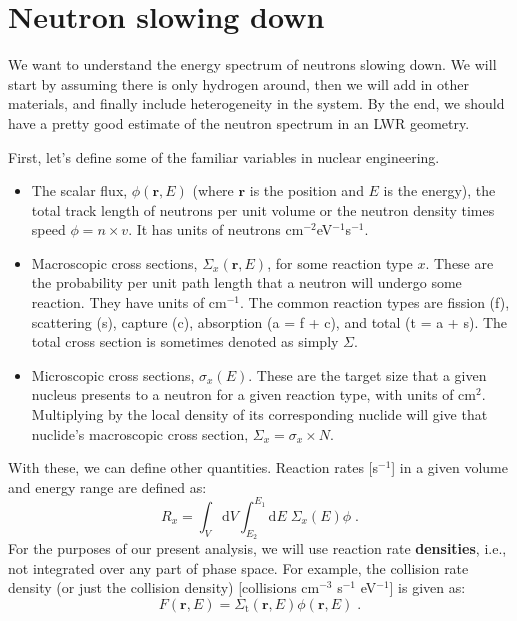 \section{Neutron slowing down}

We want to understand the energy spectrum of neutrons slowing down. We will start by assuming there is only hydrogen around, then we will add in other materials, and finally include heterogeneity in the system. By the end, we should have a pretty good estimate of the neutron spectrum in an LWR geometry.

First, let's define some of the familiar variables in nuclear engineering. 
\begin{itemize}
    \item The scalar flux, $\phi(\mathbf{r},E)$ (where $\mathbf{r}$ is the position and $E$ is the energy), the total track length of neutrons per unit volume or the neutron density times speed $\phi = n\times v$. It has units of neutrons cm$^{-2}$eV$^{-1}$s$^{-1}$.
    \item Macroscopic cross sections, $\Sigma_x(\mathbf{r},E)$, for some reaction type $x$. These are the probability per unit path length that a neutron will undergo some reaction. They have units of cm$^{-1}$. The common reaction types are fission (f), scattering (s), capture (c), absorption (a = f + c), and total (t = a + s). The total cross section is sometimes denoted as simply $\Sigma$.
    \item Microscopic cross sections, $\sigma_x(E)$. These are the target size that a given nucleus presents to a neutron for a given reaction type, with units of cm$^2$. Multiplying by the local density of its corresponding nuclide will give that nuclide's macroscopic cross section, $\Sigma_x = \sigma_x \times N$.
\end{itemize}
With these, we can define other quantities. Reaction rates [s$^{-1}$] in a given volume and energy range are defined as:
\begin{equation*}
    R_x = \int_V \mathrm{d}V \int^{E_1}_{E_2}\mathrm{d}E \;\Sigma_x(E)\phi\;\mathrm{.}
\end{equation*}
For the purposes of our present analysis, we will use reaction rate \textbf{densities}, i.e., not integrated over any part of phase space. For example, the collision rate density (or just the collision density) [collisions cm$^{-3}$ s$^{-1}$ eV$^{-1}$] is given as:
\begin{equation*}
    F(\mathbf{r},E) = \Sigma_\mathrm{t}(\mathbf{r},E)\phi(\mathbf{r},E)\;\mathrm{.}
\end{equation*}

